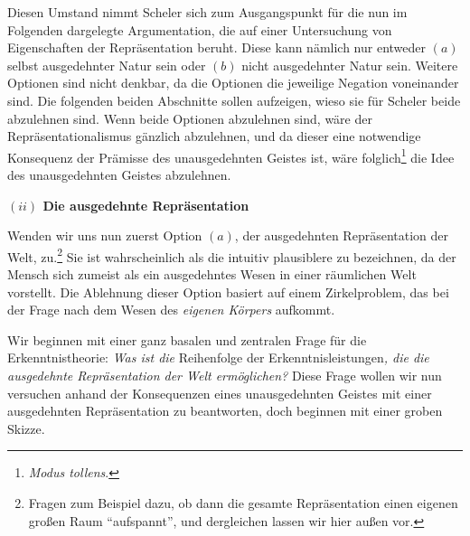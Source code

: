 \documentclass[a4paper, 12pt]{article}
\begin{document}
\begin{onehalfspace}

Diesen Umstand nimmt Scheler sich zum Ausgangspunkt für die nun im Folgenden dargelegte Argumentation, die auf einer Untersuchung von Eigenschaften der Repräsentation beruht. Diese kann nämlich nur entweder $(a)$ selbst ausgedehnter Natur sein oder $(b)$ nicht ausgedehnter Natur sein. Weitere Optionen sind nicht denkbar, da die Optionen die jeweilige Negation voneinander sind. Die folgenden beiden Abschnitte sollen aufzeigen, wieso sie für Scheler beide abzulehnen sind. Wenn beide Optionen abzulehnen sind, wäre der Repräsentationalismus gänzlich abzulehnen, und da dieser eine notwendige Konsequenz der Prämisse des unausgedehnten Geistes ist, wäre folglich\footnote{\emph{Modus tollens}.} die Idee des unausgedehnten Geistes abzulehnen.

\vspace{5mm}
\noindent\textbf{$(ii)$ Die ausgedehnte Repräsentation}


\noindent Wenden wir uns nun zuerst Option $(a)$, der ausgedehnten Repräsentation der Welt, zu.\footnote{Fragen zum Beispiel dazu, ob dann die gesamte Repräsentation einen eigenen großen Raum "`aufspannt"', und dergleichen lassen wir hier außen vor.} Sie ist wahrscheinlich als die intuitiv plausiblere zu bezeichnen, da der Mensch sich zumeist als ein ausgedehntes Wesen in einer räumlichen Welt vorstellt. Die Ablehnung dieser Option basiert auf einem Zirkelproblem, das bei der Frage nach dem Wesen des \emph{eigenen Körpers} aufkommt.


Wir beginnen mit einer ganz basalen und zentralen Frage für die Erkenntnistheorie: \emph{Was ist die} Reihenfolge der Erkenntnisleistungen\emph{, die die ausgedehnte Repräsentation der Welt ermöglichen?} Diese Frage wollen wir nun versuchen anhand der Konsequenzen eines unausgedehnten Geistes mit einer ausgedehnten Repräsentation zu beantworten, doch beginnen mit einer groben Skizze.


\end{onehalfspace}
\end{document}
